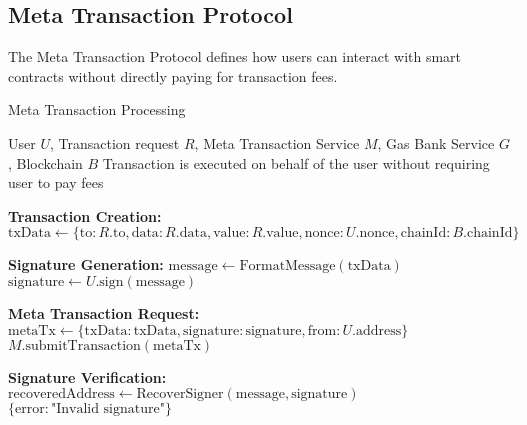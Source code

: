 \subsection{Meta Transaction Protocol}
\label{subsec:meta-tx-protocol}

The Meta Transaction Protocol defines how users can interact with smart contracts without directly paying for transaction fees.

\begin{tcolorbox}[
    enhanced,
    colback=blue!5!white,
    colframe=blue!75!black,
    arc=5mm,
    boxrule=1.5pt,
    title=Meta Tx Protocol,
    fonttitle=\bfseries,
    coltitle=white,
    attach boxed title to top left={yshift=-2mm, xshift=5mm},
    boxed title style={colback=blue!75!black, rounded corners},
    shadow={2mm}{-2mm}{0mm}{black!50},
    drop fuzzy shadow
]
\begin{tcolorbox}[
    enhanced,
    colback=blue!5!white,
    colframe=blue!75!black,
    arc=5mm,
    boxrule=1.5pt,
    title=Protocol,
    fonttitle=\bfseries,
    coltitle=white,
    attach boxed title to top left={yshift=-2mm, xshift=5mm},
    boxed title style={colback=blue!75!black, rounded corners},
    shadow={2mm}{-2mm}{0mm}{black!50},
    drop fuzzy shadow
]
\begin{protocol}{Meta Transaction Processing}
\label{prot:meta-tx-processing}
\begin{algorithmic}[1]
\Require User $U$, Transaction request $R$, Meta Transaction Service $M$, Gas Bank Service $G$, Blockchain $B$
\Ensure Transaction is executed on behalf of the user without requiring user to pay fees

\State \textbf{Transaction Creation:}
\State $\text{txData} \gets \{\text{to}: R.\text{to}, \text{data}: R.\text{data}, \text{value}: R.\text{value}, \text{nonce}: U.\text{nonce}, \text{chainId}: B.\text{chainId}\}$

\State \textbf{Signature Generation:}
\State $\text{message} \gets \text{FormatMessage}(\text{txData})$
\State $\text{signature} \gets U.\text{sign}(\text{message})$

\State \textbf{Meta Transaction Request:}
\State $\text{metaTx} \gets \{\text{txData}: \text{txData}, \text{signature}: \text{signature}, \text{from}: U.\text{address}\}$
\State $M.\text{submitTransaction}(\text{metaTx})$

\State \textbf{Signature Verification:}
\State $\text{recoveredAddress} \gets \text{RecoverSigner}(\text{message}, \text{signature})$
    \State \Return $\{\text{error}: \text{"Invalid signature"}\}$
\EndIf


\end{algorithmic}
\end{protocol}
\end{tcolorbox}
\end{tcolorbox}
